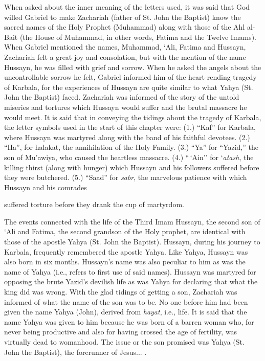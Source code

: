 \begin{quotex}
When asked about the inner meaning of the letters used, it was said that God willed Gabriel to make Zachariah (father of St. John the Baptist) know the sacred names of the Holy Prophet (Muhammad) along with those of the Ahl al-Bait (the House of Muhammad, in other words, Fatima and the Twelve Imams). When Gabriel mentioned the names, Muhammad, `Ali, Fatima and Hussayn, Zachariah felt a great joy and consolation, but with the mention of the name Hussayn, he was filled with grief and sorrow. When he asked the angels about the uncontrollable sorrow he felt, Gabriel informed him of the heart-rending tragedy of Karbala, for the experiences of Hussayn are quite similar to what Yahya (St. John the Baptist) faced. Zachariah was informed of the story of the untold miseries and tortures which Hussayn would suffer and the brutal massacre he would meet. It is said that in conveying the tidings about the tragedy of Karbala, the letter symbols used in the start of this chapter were: (1.) ``Kaf'' for Karbala, where Hussayn was martyred along with the band of his faithful devotees. (2.) ``Ha'', for halakat, the annihilation of the Holy Family. (3.) ``Ya'' for ``Yazid,'' the son of Mu'awiya, who caused the heartless massacre. (4.) ``\,`Ain'' for `\emph{atash}, the killing thirst (along with hunger) which Hussayn and his followers suffered before they were butchered. (5.) ``Saad'' for
\emph{sabr}, the marvelous patience with which Hussayn and his comrades

suffered torture before they drank the cup of martyrdom.

The events connected with the life of the Third Imam Hussayn, the second son of `Ali and Fatima, the second grandson of the Holy prophet, are identical with those of the apostle Yahya (St. John the Baptist). Hussayn, during his journey to Karbala, frequently remembered the apostle Yahya. Like Yahya, Hussayn was also born in six months. Hussayn's name was also peculiar to him as was the name of Yahya (i.e., refers to first use of said names). Hussayn was martyred for opposing the brute Yazid's devilish life as was Yahya for declaring that what the king did was wrong. With the glad tidings of getting a son, Zachariah was informed of what the name of the son was to be. No one before him had been given the name Yahya (John), derived from \emph{hayat}, i.e., life. It is said that the name Yahya was given to him because he was born of a barren woman who, for never being productive and also for having crossed the age of fertility, was virtually dead to womanhood. The issue or the son promised was Yahya (St. John the Baptist), the forerunner of Jesus... .


\end{quotex}
